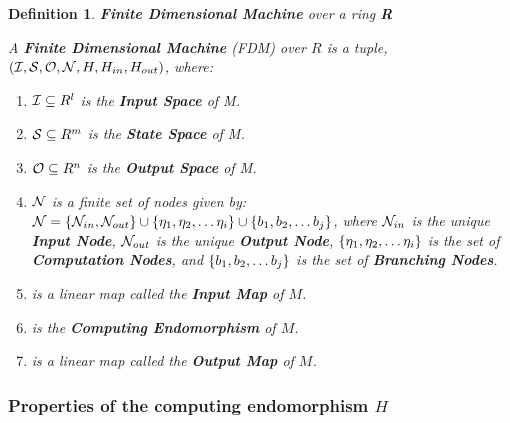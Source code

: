 \documentclass[twoside]{article}
\newtheorem{definition}{Definition}[section]
\begin{document}
\begin{definition}{\textbf{Finite Dimensional Machine} over a ring \textbf{R}}
  
  A \textbf{Finite Dimensional Machine} (FDM) over $R$ is a tuple,
  $(\mathcal{I}, \mathcal{S}, \mathcal{O}, \mathcal{N}, H, H_{in}, H_{out})$, where:
  
  \begin{enumerate}

  \item $\mathcal{I} \subseteq R^l$ is the \textbf{Input Space} of M.

  \item $\mathcal{S} \subseteq R^m$ is the \textbf{State Space} of M.

  \item $\mathcal{O} \subseteq R^n$ is the \textbf{Output Space} of M.

  \item $\mathcal{N}$ is a finite set of nodes given by: $ \mathcal{N} =
    \{\mathcal{N}_{in}, \mathcal{N}_{out}\} \cup \{\eta_1, \eta_2, \ldots \eta_i\}
    \cup \{b_1, b_2, \ldots b_j\}$, where $\mathcal{N}_{in}$ is the
    unique \textbf{Input Node}, $\mathcal{N}_{out}$ is the unique
    \textbf{Output Node}, $\{\eta_1, \eta_2, \ldots \eta_i\}$ is the
    set of \textbf{Computation Nodes}, and $ \{b_1, b_2, \ldots b_j\}$
    is the set of \textbf{Branching Nodes}.

  \item {} is a
    linear map called the \textbf{Input Map} of $M$.

  \item {} is the \textbf{Computing Endomorphism} of $M$.
    
  \item {} is
    a linear map called the \textbf{Output Map} of $M$.
    
  \end{enumerate}
  
\end{definition}


\subsubsection{Properties of the computing endomorphism $H$}
\end{document}
